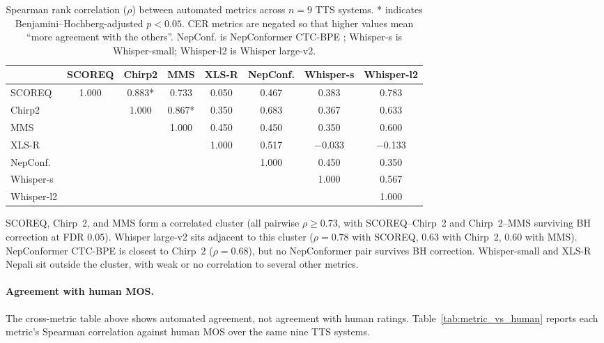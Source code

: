 \documentclass[11pt]{article}
\begin{document}
\begin{table}[t]
\centering
\caption{Spearman rank correlation ($\rho$) between automated metrics across $n = 9$ TTS systems. * indicates Benjamini--Hochberg-adjusted $p < 0.05$. CER metrics are negated so that higher values mean ``more agreement with the others''. NepConf. is NepConformer CTC-BPE \citep{poudel2026nepconformer}; Whisper-s is Whisper-small; Whisper-l2 is Whisper large-v2.}
\label{tab:correlations}
\footnotesize
\setlength{\tabcolsep}{3pt}
\begin{tabular}{lccccccc}
\toprule
 & SCOREQ & Chirp2 & MMS & XLS-R & NepConf. & Whisper-s & Whisper-l2 \\
\midrule
SCOREQ     & 1.000 & 0.883* & 0.733  & 0.050 & 0.467 & 0.383     & 0.783 \\
Chirp2     &       & 1.000  & 0.867* & 0.350 & 0.683 & 0.367     & 0.633 \\
MMS        &       &        & 1.000  & 0.450 & 0.450 & 0.350     & 0.600 \\
XLS-R      &       &        &        & 1.000 & 0.517 & $-$0.033  & $-$0.133 \\
NepConf.   &       &        &        &       & 1.000 & 0.450     & 0.350 \\
Whisper-s  &       &        &        &       &       & 1.000     & 0.567 \\
Whisper-l2 &       &        &        &       &       &           & 1.000 \\
\bottomrule
\end{tabular}
\end{table}

SCOREQ, Chirp~2, and MMS form a correlated cluster (all pairwise $\rho \geq 0.73$, with SCOREQ--Chirp~2 and Chirp~2--MMS surviving BH correction at FDR $0.05$). Whisper large-v2 sits adjacent to this cluster ($\rho = 0.78$ with SCOREQ, $0.63$ with Chirp~2, $0.60$ with MMS). NepConformer CTC-BPE is closest to Chirp~2 ($\rho = 0.68$), but no NepConformer pair survives BH correction. Whisper-small and XLS-R Nepali sit outside the cluster, with weak or no correlation to several other metrics.

\paragraph{Agreement with human MOS.} The cross-metric table above shows automated agreement, not agreement with human ratings. Table~\ref{tab:metric_vs_human} reports each metric's Spearman correlation against human MOS over the same nine TTS systems.
\end{document}
